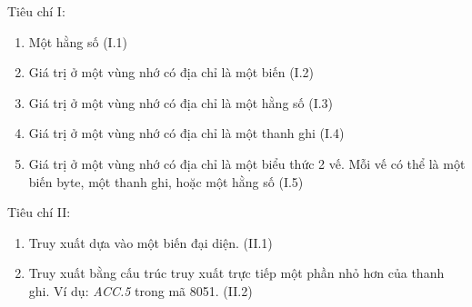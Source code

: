 Tiêu chí I:
\begin{enumerate}
	\item Một hằng số (I.1)
	\item Giá trị ở một vùng nhớ có địa chỉ là một biến (I.2)
	\item Giá trị ở một vùng nhớ có địa chỉ là một hằng số (I.3)
	\item Giá trị ở một vùng nhớ có địa chỉ là một thanh ghi (I.4)
	\item Giá trị ở một vùng nhớ có địa chỉ là một biểu thức 2 vế. Mỗi vế có thể là một biến byte, một thanh ghi, hoặc một hằng số (I.5)
\end{enumerate}

Tiêu chí II:
\begin{enumerate}
	\item Truy xuất dựa vào một biến đại diện. (II.1)
	\item Truy xuất bằng cấu trúc truy xuất trực tiếp một phần nhỏ hơn của thanh ghi. Ví dụ: \textit{ACC.5} trong mã 8051. (II.2)
\end{enumerate}

